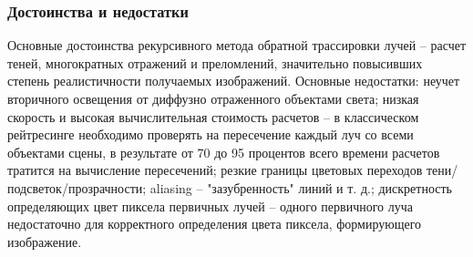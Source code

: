 \subsubsection{Достоинства и недостатки}

Основные достоинства рекурсивного метода обратной трассировки лучей – расчет теней, многократных отражений и преломлений, значительно повысивших степень реалистичности получаемых изображений.
Основные недостатки: неучет вторичного освещения от диффузно отраженного объектами света; низкая скорость и высокая вычислительная стоимость расчетов – в классическом рейтресинге необходимо проверять на пересечение каждый луч со всеми объектами сцены, в результате от 70 до 95 процентов всего времени расчетов тратится на вычисление пересечений; резкие границы цветовых переходов тени/подсветок/прозрачности; aliasing – "зазубренность" линий и т. д.; дискретность определяющих цвет пиксела первичных лучей – одного первичного луча недостаточно для корректного определения цвета пиксела, формирующего изображение.
